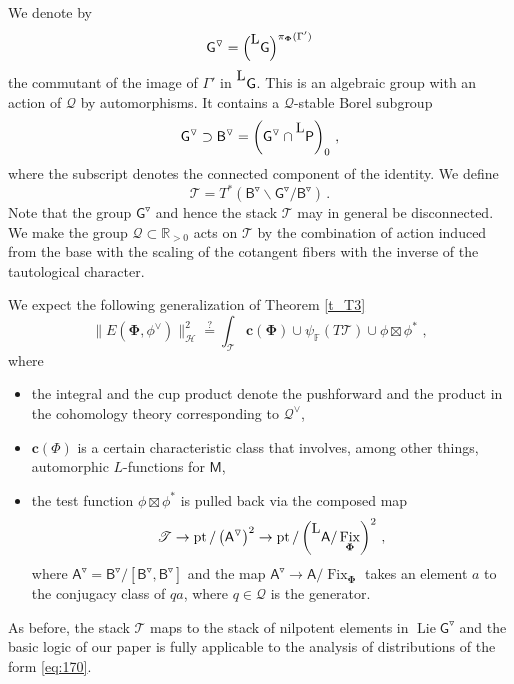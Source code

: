 \documentclass[14pt]{extarticle}
\newcommand{\F}{\mathbb{F}}
\newcommand{\R}{\mathbb{R}}
\newcommand{\bA}{\mathsf{A}}
\newcommand{\bG}{\mathsf{G}}
\newcommand{\sP}{\mathsf{P}}
\newcommand{\bM}{\mathsf{M}}
\newcommand{\bB}{\mathsf{B}}
\newcommand{\cT}{\mathscr{T}}
\newcommand{\cQ}{\mathscr{Q}}
\newcommand{\La}{{}^{\raisebox{2pt}{\textup{\tiny\textsf{L}}}}}
\newcommand{\bbc}{\mathbf{c}}
\newcommand{\bPhi}{\boldsymbol{\Phi}}
\newcommand{\cH}{\mathscr{H}}
\DeclareMathOperator{\Lie}{Lie}
\DeclareMathOperator{\pt}{pt}
\DeclareMathOperator{\Fix}{Fix}
\theoremstyle{definition}
\begin{document}
We denote by
\[
  \bG^{\triangledown} = \Big(\La \bG\Big)^{\pi_{\bPhi}(\Gamma')}
\]
the commutant of the image of $\Gamma'$ in $\La \bG$. This is an
algebraic group with an action of $\cQ$ by automorphisms. It contains
a $\cQ$-stable Borel subgroup
\[
  \bG^{\triangledown} \supset \bB^{\triangledown} =
  \left(\bG^{\triangledown} \cap \La \sP \right)_0 \,, 
\]
where the subscript denotes the connected component of the identity. 
We define
%
\begin{equation}
  \label{eq:181}
  \cT = T^*( \bB^{\triangledown}  \backslash \bG^{\triangledown} /
  \bB^{\triangledown} )  \,. 
\end{equation}
%
Note that the group $\bG^{\triangledown}$ and hence the stack $\cT$
may in general be disconnected.
We make the group $\cQ\subset \R_{>0}$ acts on $\cT$
by the combination of action induced from the base with
the scaling of the cotangent fibers with the inverse of the
tautological character.

We expect the following generalization of
Theorem \ref{t_T3}
%
\begin{equation}
  \label{eq:170}
  \| E(\bPhi, \phi^\vee) \|_\cH^2 \overset{?} =
  \int_{\cT} \bbc(\bPhi) \cup \psi_\F(T \cT) \cup \phi \boxtimes \phi^*\, \,, 
\end{equation}
%
where
\begin{itemize}
\item the integral and the cup product denote the pushforward and the
  product in the cohomology
  theory corresponding to $\cQ^\vee$, 
\item $\bbc(\Phi)$ is a certain characteristic class that involves,
  among other things, automorphic $L$-functions for $\bM$,
\item the test function $\phi \boxtimes \phi^*$ is pulled back via
  the composed map
  \[
  \cT \to \pt/ \left(\bA^\triangledown\right)^2 \to \pt/ \left(\La \bA/
      \Fix_{\bPhi}\right)^2\,, 
  \]
  where $\bA^\triangledown = \bB^{\triangledown}/[\bB^{\triangledown},
 \bB^{\triangledown}]$ and the map $\bA^\triangledown \to \bA/
      \Fix_{\bPhi}$ takes an element $a$ to the conjugacy class of
      $qa$, where $q\in \cQ$ is the generator. 
\end{itemize}


As before, the stack $\cT$ maps to the stack of nilpotent elements in
$\Lie \bG^\triangledown$ and the basic logic of our paper is fully
applicable to the analysis of distributions of the form \eqref{eq:170}. 

\subsubsection{}
\end{document}
